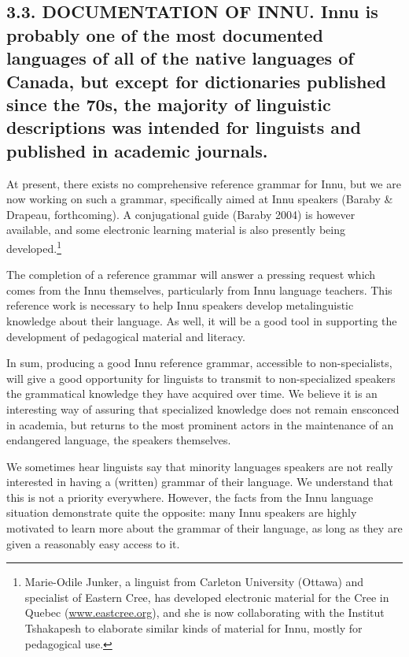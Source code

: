 \documentclass[letterpaper]{article}
\newcommand\textstyleInternetlink[1]{#1}
\begin{document}
\subsection[3.3. DOCUMENTATION OF INNU. Innu is probably one of the most documented languages of all of the native languages of Canada, but except for dictionaries published since the 70s, the majority of linguistic descriptions was intended for linguists and published in academic journals.]{3.3. DOCUMENTATION OF INNU. \textmd{Innu }\textmd{is}\textmd{ probably one of the most documented languages }\textmd{of}\textmd{ all of}\textmd{ }\textmd{the }\textmd{native languages of }\textmd{Canad}\textmd{a}\textmd{, but except for dictionaries published since the 70s, }\textmd{the majority }\textmd{of linguistic description}\textmd{s}\textmd{ was intended }\textmd{for }\textmd{linguists and published in }\textmd{academic}\textmd{ journals.}}
At present, there exists no comprehensive reference grammar for Innu, but we are now working on such a grammar, specifically aimed at Innu speakers (Baraby \& Drapeau, forthcoming). A conjugational guide (Baraby 2004) is however available, and some electronic learning material is also presently being developed.\footnote{ Marie-Odile Junker, a linguist from Carleton University (Ottawa) and specialist of Eastern Cree, has developed electronic material for the Cree in Quebec (\href{http://www.eastcree.org/}{\textstyleInternetlink{www.eastcree.org}}), and she is now collaborating with the Institut Tshakapesh to elaborate similar kinds of material for Innu, mostly for pedagogical use.}

The completion of a reference grammar will answer a pressing request which comes from the Innu themselves, particularly from Innu language teachers. This reference work is necessary to help Innu speakers develop metalinguistic knowledge about their language. As well, it will be a good tool in supporting the development of pedagogical material and literacy.

In sum, producing a good Innu reference grammar, accessible to non-specialists, will give a good opportunity for linguists to transmit to non-specialized speakers the grammatical knowledge they have acquired over time. We believe it is an interesting way of assuring that specialized knowledge does not remain ensconced in academia, but returns to the most prominent actors in the maintenance of an endangered language, the speakers themselves.

We sometimes hear linguists say that minority languages speakers are not really interested in having a (written) grammar of their language. We understand that this is not a priority everywhere. However, the facts from the Innu language situation demonstrate quite the opposite: many Innu speakers are highly motivated to learn more about the grammar of their language, as long as they are given a reasonably easy access to it. 
\end{document}
